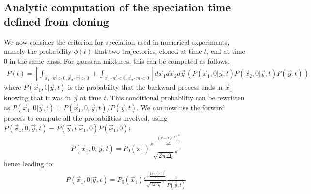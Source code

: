 \documentclass[10pt,twocolumn]{article}
\newcommand{\vm}{\vec m}
\begin{document}
\subsection{Analytic computation of the speciation time defined from cloning}
We now consider the criterion for speciation used in numerical experiments, namely the probability $\phi(t)$ that two trajectories, cloned at time $t$, end at time $0$ in the same class. For gaussian mixtures,  this can be computed as 
follows.
\begin{align}
P(t)=\left[\int_{\vec x_1 \cdot \vm >0,\vec x_2 \cdot \vm >0} +\int_{\vec x_1 \cdot \vm <0,\vec x_2 \cdot \vm<0}\right] d\vec x_1 d\vec x_2 d\vec y \,\left(P(\vec x_1, 0|\vec y,t)P(\vec x_2, 0|\vec y,t)P(\vec y,t)\right)
\end{align}
where $P(\vec x_1, 0|\vec y,t)$ is the probability that the backward process ends in $\vec x_1$ knowing that it was in $\vec y$ at time $t$. This conditional probability can be rewritten as $P(\vec x_1, 0|\vec y,t)=P(\vec x_1, 0,\vec y,t)/P(\vec y,t)$. We can now use the forward process to compute all the probabilities involved, using 
$P(\vec x_1, 0,\vec y,t)=P(\vec y,t|\vec x_1, 0)P(\vec x_1, 0)$:
\[
P(\vec x_1, 0,\vec y,t)=P_0(\vec x_1)\frac{e^{-\frac{(\vec y -\vec x_1 e^{-t})^2}{2\Delta_t}}}{\sqrt{2\pi\Delta_t}^d}
\]
hence leading to:
\begin{align}
P(\vec x_1, 0|\vec y,t)=P_0(\vec x_1)\frac{e^{-\frac{(\vec y -\vec x_1 e^{-t})^2}{2\Delta_t}}}{\sqrt{2\pi\Delta_t}^d}\frac{1}{P(\vec y,t)}
\end{align}
 
\end{document}
